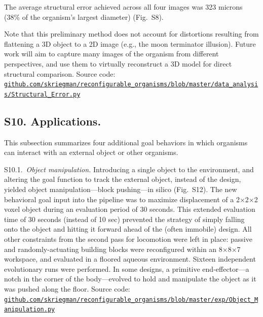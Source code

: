 The average structural error achieved across all four images was 323 microns (38\% of the organism's largest diameter) (Fig.~S8). 

Note that this preliminary method does not account for distortions resulting from flattening a 3D object to a 2D image (e.g., the moon terminator illusion). 
Future work will aim to capture many images of the organism from different perspectives, and use them to virtually reconstruct a 3D model for direct structural comparison. Source code:
\href{https://github.com/skriegman/reconfigurable_organisms/blob/master/data_analysis/Structural_Error.py}{\scriptsize\tt\color{blue}github.com/skriegman/reconfigurable\_organisms/blob/master/data\_analysis/Structural\_Error.py}


\subsection*{S10. Applications.}

This subsection summarizes four additional goal behaviors in which organisms can interact with an external object or other organisms.

\vspace{1em}

S10.1.~\textit{Object manipulation.}
Introducing a single object to the environment, and altering the goal function to track the external object, instead of the design, yielded object manipulation---block pushing---in silico (Fig.~S12). 
The new behavioral goal input into the pipeline was to maximize displacement of a 2{$\times$}2{$\times$}2 voxel object during an evaluation period of 30 seconds. This extended evaluation time of 30 seconds (instead of 10 sec) prevented the strategy of simply falling onto the object and hitting it forward ahead of the (often immobile) design. 
All other constraints from the second pass for locomotion were left in place: passive and randomly-actuating building blocks were reconfigured within an 8{$\times$}8{$\times$}7 workspace, and evaluated in a floored aqueous environment. Sixteen independent evolutionary runs were performed. 
In some designs, a primitive end-effector---a notch in the corner of the body---evolved to hold and manipulate the object as it was pushed along the floor. Source code: 
\href{https://github.com/skriegman/reconfigurable_organisms/blob/master/exp/Object_Manipulation.py}{\scriptsize\tt\color{blue}github.com/skriegman/reconfigurable\_organisms/blob/master/exp/Object\_Manipulation.py}

\vspace{1em}


